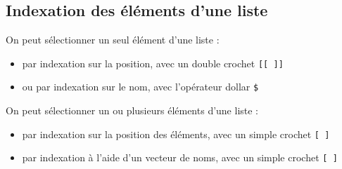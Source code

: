 \documentclass[
]{book}
\providecommand{\tightlist}{%
  \setlength{\itemsep}{0pt}\setlength{\parskip}{0pt}}
\begin{document}
\subsection{Indexation des éléments d'une liste}\label{indexation-des-uxe9luxe9ments-dune-liste}

On peut sélectionner un seul élément d'une liste :

\begin{itemize}
\tightlist
\item
  par indexation sur la position, avec un double crochet \texttt{{[}{[}\ {]}{]}}
\item
  ou par indexation sur le nom, avec l'opérateur dollar \texttt{\$}
\end{itemize}

On peut sélectionner un ou plusieurs éléments d'une liste :

\begin{itemize}
\tightlist
\item
  par indexation sur la position des éléments, avec un simple crochet \texttt{{[}\ {]}}
\item
  par indexation à l'aide d'un vecteur de noms, avec un simple crochet \texttt{{[}\ {]}}
\end{itemize}
\end{document}
